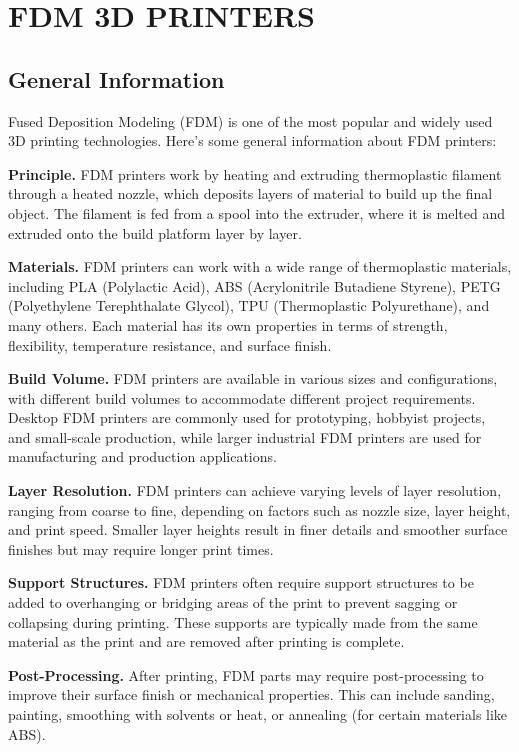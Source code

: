 \chapter{FDM 3D PRINTERS}

\section{General Information}

Fused Deposition Modeling (FDM) is one of the most popular and widely used 3D printing technologies. Here's some general information about FDM printers:

\noindent\textbf{Principle.}
FDM printers work by heating and extruding thermoplastic filament through a heated nozzle, which deposits layers of material to build up the final object. The filament is fed from a spool into the extruder, where it is melted and extruded onto the build platform layer by layer.

\noindent\textbf{Materials.}
FDM printers can work with a wide range of thermoplastic materials, including PLA (Polylactic Acid), ABS (Acrylonitrile Butadiene Styrene), PETG (Polyethylene Terephthalate Glycol), TPU (Thermoplastic Polyurethane), and many others. Each material has its own properties in terms of strength, flexibility, temperature resistance, and surface finish.

\noindent\textbf{Build Volume.}
FDM printers are available in various sizes and configurations, with different build volumes to accommodate different project requirements. Desktop FDM printers are commonly used for prototyping, hobbyist projects, and small-scale production, while larger industrial FDM printers are used for manufacturing and production applications.

\noindent\textbf{Layer Resolution.}
FDM printers can achieve varying levels of layer resolution, ranging from coarse to fine, depending on factors such as nozzle size, layer height, and print speed. Smaller layer heights result in finer details and smoother surface finishes but may require longer print times.

\noindent\textbf{Support Structures.}
FDM printers often require support structures to be added to overhanging or bridging areas of the print to prevent sagging or collapsing during printing. These supports are typically made from the same material as the print and are removed after printing is complete.

\noindent\textbf{Post-Processing.}
After printing, FDM parts may require post-processing to improve their surface finish or mechanical properties. This can include sanding, painting, smoothing with solvents or heat, or annealing (for certain materials like ABS).

